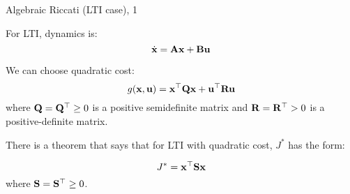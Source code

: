 \documentclass{beamer}
\begin{document}
\begin{frame}{Algebraic Riccati (LTI case), 1}
\begin{flushleft}

For LTI, dynamics is:
\begin{equation}
\dot {\mathbf{x}} = \mathbf{A}  \mathbf{x} + \mathbf{B} \mathbf{u}
\end{equation}

We can choose quadratic cost:
\begin{equation}
g(\mathbf{x}, \mathbf{u} ) = 
\mathbf{x}^\top \mathbf{Q} \mathbf{x} +
\mathbf{u} ^\top \mathbf{R} \mathbf{u} 
\end{equation}
%
where $\mathbf{Q} = \mathbf{Q}^\top \geq 0 $ is a positive semidefinite matrix and $\mathbf{R} = \mathbf{R}^\top > 0$ is a positive-definite matrix.

\bigskip

There is a theorem that says that for LTI with quadratic cost, $J^*$ has the form:

\begin{equation}
	J^* = \mathbf{x}^\top \mathbf{S} \mathbf{x}
\end{equation}
%
where $\mathbf{S} = \mathbf{S}^\top \geq 0$.


\end{flushleft}
\end{frame}
\end{document}
